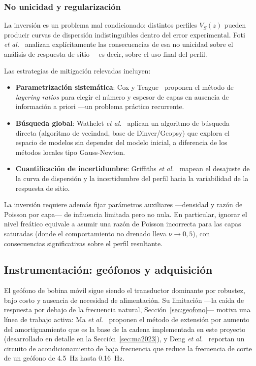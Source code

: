 \subsubsection{No unicidad y regularizaci\'on}
\label{sec:no-unicidad}

La inversi\'on es un problema mal condicionado: distintos perfiles $V_S(z)$ pueden producir
curvas de dispersi\'on indistinguibles dentro del error experimental. Foti \emph{et
al.}~\cite{Foti2009} analizan expl\'icitamente las consecuencias de esa no unicidad sobre
el an\'alisis de respuesta de sitio ---es decir, sobre el uso final del perfil.

Las estrategias de mitigaci\'on relevadas incluyen:

\begin{itemize}[itemsep=0.15em]
    \item \textbf{Parametrizaci\'on sistem\'atica}: Cox y Teague~\cite{Cox2016} proponen el
    m\'etodo de \emph{layering ratios} para elegir el n\'umero y espesor de capas en ausencia
    de informaci\'on a priori ---un problema pr\'actico recurrente.
    \item \textbf{B\'usqueda global}: Wathelet \emph{et al.}~\cite{Wathelet2004} aplican un
    algoritmo de b\'usqueda directa (algoritmo de vecindad, base de Dinver/Geopsy) que
    explora el espacio de modelos sin depender del modelo inicial, a diferencia de los
    m\'etodos locales tipo Gauss-Newton.
    \item \textbf{Cuantificaci\'on de incertidumbre}: Griffiths \emph{et
    al.}~\cite{Griffiths2016} mapean el desajuste de la curva de dispersi\'on y la
    incertidumbre del perfil hacia la variabilidad de la respuesta de sitio.
\end{itemize}

La inversi\'on requiere adem\'as fijar par\'ametros auxiliares ---densidad y raz\'on de
Poisson por capa--- de influencia limitada pero no nula. En particular, ignorar el nivel
fre\'atico equivale a asumir una raz\'on de Poisson incorrecta para las capas saturadas
(donde el comportamiento no drenado lleva $\nu\to0{,}5$), con consecuencias
significativas sobre el perfil resultante.

\subsection{Instrumentaci\'on: ge\'ofonos y adquisici\'on}

El ge\'ofono de bobina m\'ovil sigue siendo el transductor dominante por robustez, bajo
costo y ausencia de necesidad de alimentaci\'on. Su limitaci\'on ---la ca\'ida de respuesta
por debajo de la frecuencia natural, Secci\'on~\ref{sec:geofono}--- motiva una l\'inea de
trabajo activa: Ma \emph{et al.}~\cite{Ma2023} proponen el m\'etodo de extensi\'on por
aumento del amortiguamiento que es la base de la cadena implementada en este proyecto
(desarrollado en detalle en la Secci\'on~\ref{sec:ma2023}), y Deng \emph{et
al.}~\cite{Deng2025} reportan un circuito de acondicionamiento de baja frecuencia que
reduce la frecuencia de corte de un ge\'ofono de \SI{4.5}{\hertz} hasta
\SI{0.16}{\hertz}.

